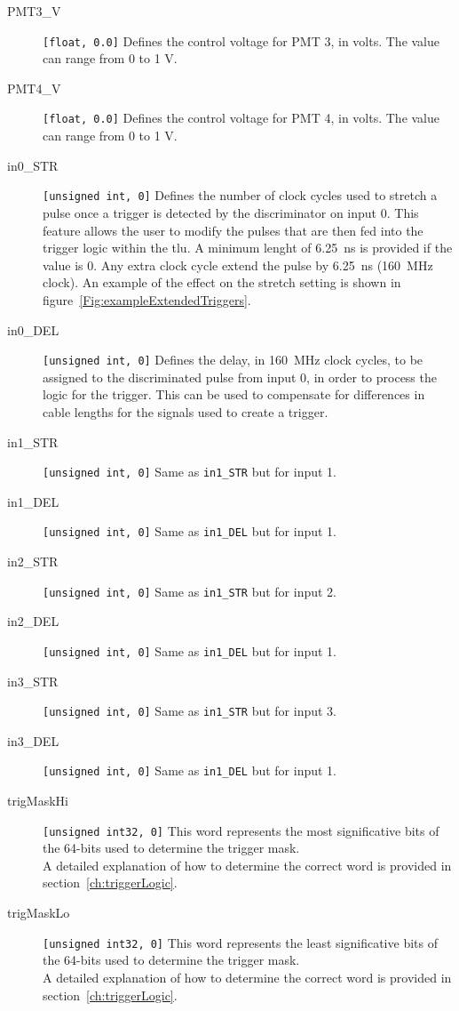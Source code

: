 \begin{description}
  \item[PMT3\_V] \verb|[float, 0.0]| Defines the control voltage for PMT 3, in volts. The value can range from 0 to 1 V.
  \item[PMT4\_V] \verb|[float, 0.0]| Defines the control voltage for PMT 4, in volts. The value can range from 0 to 1 V.
  \item[in0\_STR] \verb|[unsigned int, 0]| Defines the number of clock cycles used to stretch a pulse once a trigger is detected by the discriminator on input 0. This feature allows the user to modify the pulses that are then fed into the trigger logic within the \gls{tlu}.
      A minimum lenght of 6.25~ns is provided if the value is 0. Any extra clock cycle extend the pulse by 6.25~ns (160~MHz clock). An example of the effect on the stretch setting is shown in figure~\ref{Fig:exampleExtendedTriggers}.
  \item[in0\_DEL] \verb|[unsigned int, 0]| Defines the delay, in 160~MHz clock cycles, to be assigned to the discriminated pulse from input 0, in order to process the logic for the trigger. This can be used to compensate for differences in cable lengths for the signals used to create a trigger.
  \item[in1\_STR] \verb|[unsigned int, 0]| Same as \texttt{in1\_STR} but for input 1.
  \item[in1\_DEL] \verb|[unsigned int, 0]| Same as \texttt{in1\_DEL} but for input 1.
  \item[in2\_STR] \verb|[unsigned int, 0]| Same as \texttt{in1\_STR} but for input 2.
  \item[in2\_DEL] \verb|[unsigned int, 0]| Same as \texttt{in1\_DEL} but for input 1.
  \item[in3\_STR] \verb|[unsigned int, 0]| Same as \texttt{in1\_STR} but for input 3.
  \item[in3\_DEL] \verb|[unsigned int, 0]| Same as \texttt{in1\_DEL} but for input 1.
  \item[trigMaskHi] \verb|[unsigned int32, 0]| This word represents the most significative bits of the 64-bits used to determine the trigger mask.\\
        A detailed explanation of how to determine the correct word is provided in section~\ref{ch:triggerLogic}.
  \item[trigMaskLo] \verb|[unsigned int32, 0]| This word represents the least significative bits of the 64-bits used to determine the trigger mask.\\
        A detailed explanation of how to determine the correct word is provided in section~\ref{ch:triggerLogic}.

\end{description}
